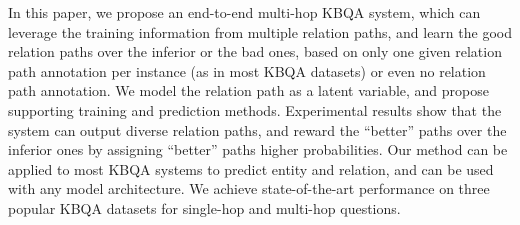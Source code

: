 In this paper, we propose an end-to-end multi-hop KBQA system, which can leverage the training information from multiple relation paths, and learn the good relation paths over the inferior or the bad ones, based on only one given relation path annotation per instance (as in most KBQA datasets) or even no relation path annotation. We model the relation path as a latent variable, and propose supporting training and prediction methods. Experimental results show that the system can output diverse relation paths, and reward the ``better'' paths over the inferior ones by assigning ``better'' paths higher probabilities. Our method can be applied to most KBQA systems to predict entity and relation, and can be used with any model architecture. We achieve state-of-the-art performance on three popular KBQA datasets for single-hop and multi-hop questions.%

